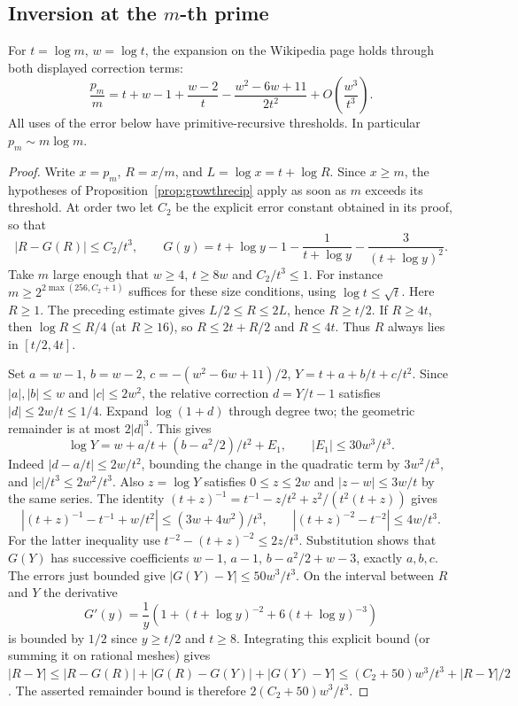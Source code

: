 \subsection{Inversion at the \(m\)-th prime}
\begin{theorem}
For $t=\log m$, $w=\log t$, the expansion on the Wikipedia page holds through both displayed correction terms:
\[
 \frac{p_m}{m}
 =t+w-1+\frac{w-2}{t}
 -\frac{w^2-6w+11}{2t^2}
 +O\!\left(\frac{w^3}{t^3}\right).
\]
All uses of the error below have primitive-recursive thresholds. In particular $p_m\sim m\log m$.
\end{theorem}
\begin{proof}
Write $x=p_m$, $R=x/m$, and $L=\log x=t+\log R$. Since $x\ge m$, the hypotheses of Proposition~\ref{prop:growthrecip} apply as soon as $m$ exceeds its threshold. At order two let $C_2$ be the explicit error constant obtained in its proof, so that
\[
 |R-G(R)|\le C_2/t^3,\qquad
 G(y)=t+\log y-1-\frac1{t+\log y}-\frac3{(t+\log y)^2}.
\]
Take $m$ large enough that $w\ge4$, $t\ge8w$ and $C_2/t^3\le1$. For instance $m\ge2^{2\max(256,C_2+1)}$ suffices for these size conditions, using $\log t\le\sqrt t$. Here $R\ge1$. The preceding estimate gives $L/2\le R\le2L$, hence $R\ge t/2$. If $R\ge4t$, then $\log R\le R/4$ (at $R\ge16$), so $R\le2t+R/2$ and $R\le4t$. Thus $R$ always lies in $[t/2,4t]$.

Set $a=w-1$, $b=w-2$, $c=-(w^2-6w+11)/2$, $Y=t+a+b/t+c/t^2$. Since $|a|,|b|\le w$ and $|c|\le2w^2$, the relative correction $d=Y/t-1$ satisfies $|d|\le2w/t\le1/4$. Expand $\log(1+d)$ through degree two; the geometric remainder is at most $2|d|^3$. This gives
\[
 \log Y=w+a/t+(b-a^2/2)/t^2+E_1,\qquad |E_1|\le30w^3/t^3 .
\]
Indeed $|d-a/t|\le2w/t^2$, bounding the change in the quadratic term by $3w^2/t^3$, and $|c|/t^3\le2w^2/t^3$. Also $z=\log Y$ satisfies $0\le z\le2w$ and $|z-w|\le3w/t$ by the same series. The identity
$(t+z)^{-1}=t^{-1}-z/t^2+z^2/(t^2(t+z))$ gives
\[
 \left|(t+z)^{-1}-t^{-1}+w/t^2\right|\le(3w+4w^2)/t^3,\qquad
 \left|(t+z)^{-2}-t^{-2}\right|\le4w/t^3.
\]
For the latter inequality use $t^{-2}-(t+z)^{-2}\le2z/t^3$. Substitution shows that $G(Y)$ has successive coefficients $w-1$, $a-1$, $b-a^2/2+w-3$, exactly $a,b,c$. The errors just bounded give $|G(Y)-Y|\le50w^3/t^3$. On the interval between $R$ and $Y$ the derivative
\[
 G'(y)=\frac1y\left(1+(t+\log y)^{-2}+6(t+\log y)^{-3}\right)
\]
is bounded by $1/2$ since $y\ge t/2$ and $t\ge8$. Integrating this explicit bound (or summing it on rational meshes) gives $|R-Y|\le |R-G(R)|+|G(R)-G(Y)|+|G(Y)-Y|\le(C_2+50)w^3/t^3+|R-Y|/2$. The asserted remainder bound is therefore $2(C_2+50)w^3/t^3$.
\end{proof}

